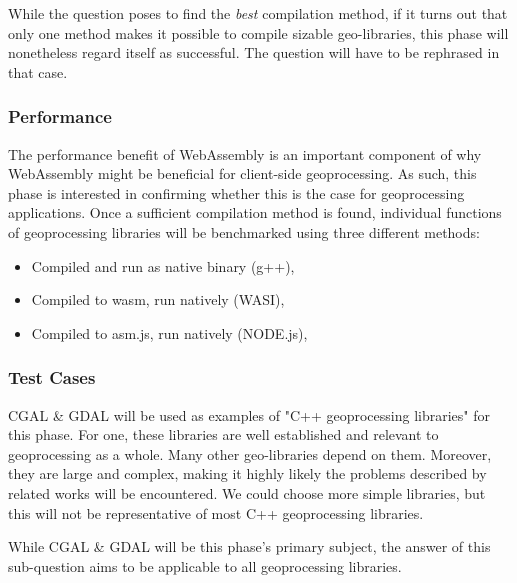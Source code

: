 While the question poses to find the \textit{best} compilation method, if it turns out that only one method makes it possible to compile sizable geo-libraries, this phase will nonetheless regard itself as successful. The question will have to be rephrased in that case. 

\subsubsection*{Performance}
The performance benefit of WebAssembly is an important component of why WebAssembly might be beneficial for client-side geoprocessing. As such, this phase is interested in confirming whether this is the case for geoprocessing applications. Once a sufficient compilation method is found, individual functions of geoprocessing libraries will be benchmarked using three different methods: 

\begin{itemize}
  \item Compiled and run as native binary (g++), 
  \item Compiled to wasm, run natively (WASI),
  \item Compiled to asm.js, run natively (NODE.js),
\end{itemize}

\subsubsection*{Test Cases}
CGAL \& GDAL will be used as examples of "C++ geoprocessing libraries" for this phase. For one, these libraries are well established and relevant to geoprocessing as a whole. Many other geo-libraries depend on them. Moreover, they are large and complex, making it highly likely the problems described by related works will be encountered. We could choose more simple libraries, but this will not be representative of most C++ geoprocessing libraries. 

While CGAL \& GDAL will be this phase's primary subject, the answer of this sub-question aims to be applicable to all geoprocessing libraries. 


